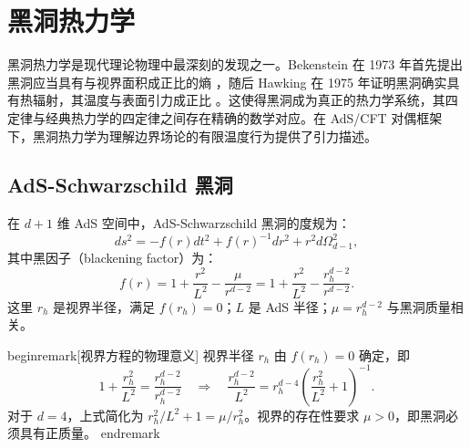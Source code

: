 
\section{黑洞热力学}

\begin{note}[物理动机]
黑洞热力学是现代理论物理中最深刻的发现之一。Bekenstein 在 1973 年首先提出黑洞应当具有与视界面积成正比的熵 \cite{Bekenstein1973}，随后 Hawking 在 1975 年证明黑洞确实具有热辐射，其温度与表面引力成正比 \cite{Hawking1975}。这使得黑洞成为真正的热力学系统，其四定律与经典热力学的四定律之间存在精确的数学对应。在 AdS/CFT 对偶框架下，黑洞热力学为理解边界场论的有限温度行为提供了引力描述。
\end{note}

\subsection{AdS-Schwarzschild 黑洞}

\begin{definition}\label{def:AdS-Schwarzschild}
在 $d+1$ 维 AdS 空间中，AdS-Schwarzschild 黑洞的度规为：
\begin{equation}\label{eq:AdS-Schwarzschild-metric}
    ds^2 = -f(r) dt^2 + f(r)^{-1} dr^2 + r^2 d\Omega_{d-1}^2,
\end{equation}
其中黑因子（blackening factor）为：
\begin{equation}\label{eq:blackening-factor}
    f(r) = 1 + \frac{r^2}{L^2} - \frac{\mu}{r^{d-2}} = 1 + \frac{r^2}{L^2} - \frac{r_h^{d-2}}{r^{d-2}}.
\end{equation}
这里 $r_h$ 是视界半径，满足 $f(r_h)=0$；$L$ 是 AdS 半径；$\mu = r_h^{d-2}$ 与黑洞质量相关。
\end{definition}

begin{remark}[视界方程的物理意义]
视界半径 $r_h$ 由 $f(r_h) = 0$ 确定，即
\begin{equation}
    1 + \frac{r_h^2}{L^2} = \frac{r_h^{d-2}}{r_h^{d-2}} \quad\Longrightarrow\quad \frac{r_h^{d-2}}{L^2} = r_h^{d-4}\left(\frac{r_h^2}{L^2} + 1\right)^{-1}.
\end{equation}
对于 $d=4$，上式简化为 $r_h^2/L^2 + 1 = \mu/r_h^2$。视界的存在性要求 $\mu > 0$，即黑洞必须具有正质量。
end{remark}

